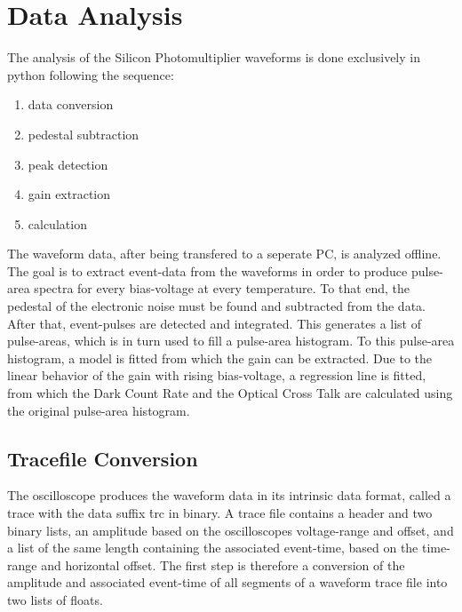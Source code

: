 \documentclass[12pt,article,type=msc,colorback,accentcolor=tud9c]{tudthesis}
\begin{document}

\clearpage

\section{\Large Data Analysis}
The analysis of the Silicon Photomultiplier waveforms is done exclusively in python following the sequence:
\begin{enumerate}[topsep=0pt,itemsep=-1ex,partopsep=1ex,parsep=1ex]
\item data conversion
\item pedestal subtraction
\item peak detection
\item gain extraction
\item calculation
\end{enumerate}
The waveform data, after being transfered to a seperate PC, is analyzed offline. The goal is to extract event-data from the waveforms in order to produce pulse-area spectra for every bias-voltage at every temperature. To that end, the pedestal of the electronic noise must be found and subtracted from the data. After that, event-pulses are detected and integrated. This generates a list of pulse-areas, which is in turn used to fill a pulse-area histogram. To this pulse-area histogram, a model is fitted from which the gain can be extracted. Due to the linear behavior of the gain with rising bias-voltage, a regression line is fitted, from which the Dark Count Rate and the Optical Cross Talk are calculated using the original pulse-area histogram.
\subsection{Tracefile Conversion}
The oscilloscope produces the waveform data in its intrinsic data format, called a trace with the data suffix \.trc in binary. A trace file contains a header and two binary lists, an amplitude based on the oscilloscopes voltage-range and offset, and a list of the same length containing the associated event-time, based on the time-range and horizontal offset. The first step is therefore a conversion of the amplitude and associated event-time of all segments of a waveform trace file into two lists of floats. 
\clearpage
\end{document}
